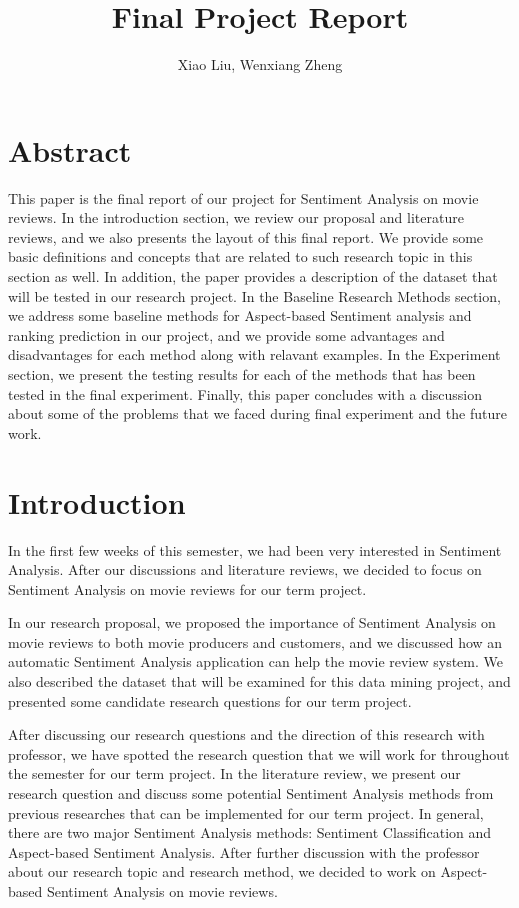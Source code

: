 \documentclass[12pt]{article}
\title{Final Project Report}
\author{Xiao Liu, Wenxiang Zheng}
\begin{document}
\maketitle
\section{Abstract}
This paper is the final report of our project for Sentiment Analysis on movie reviews. In the introduction section, we review our proposal and literature reviews, and we also presents the layout of this final report. We provide some basic definitions and concepts that are related to such research topic in this section as well. In addition, the paper  provides a description of the dataset that will be tested in our research project. In the Baseline Research Methods section, we address some baseline methods for Aspect-based Sentiment analysis and ranking prediction in our project, and we provide some advantages and disadvantages for each method along with relavant examples. In the Experiment section, we present the testing results for each of the methods that has been tested in the final experiment. Finally, this paper concludes with a discussion about some of the problems that we faced during final experiment and the future work.
\section{Introduction}
In the first few weeks of this semester, we had been very interested in Sentiment Analysis. After our discussions and literature reviews, we decided to focus on Sentiment Analysis on movie reviews for our term project. 

	In our research proposal, we proposed the importance of Sentiment Analysis on movie reviews to both movie producers and customers, and we discussed how an automatic Sentiment Analysis application can help the movie review system. We also described the dataset that will be examined for this data mining project, and presented some candidate research questions for our term project. 

After discussing our research questions and the direction of this research with professor,  we have spotted the research question that we will work for throughout the semester for our term project. In the literature review, we present our research question and discuss some potential Sentiment Analysis methods from previous researches that can be implemented for our term project. In general, there are two major Sentiment Analysis methods: Sentiment Classification and Aspect-based Sentiment Analysis. After further discussion with the professor about our research topic and research method, we decided to work on Aspect-based Sentiment Analysis on movie reviews. 
\end{document}
